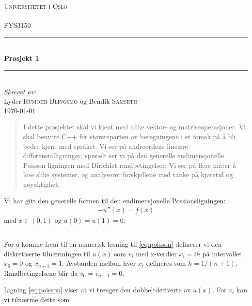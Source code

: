 \documentclass[11pt]{article}
\begin{document}
\begin{titlepage}
\newcommand{\HRule}{\rule{\linewidth}{0.5mm}}
\center
\textsc{\LARGE Universitetet i Oslo}\\[1.5cm] %
\textsc{\Large }\\[0.5cm] %
\textsc{\large FYS3150}\\[0.5cm] %
\HRule \\[0.4cm]
{ \huge \bfseries Prosjekt 1 }\\[0.4cm] %
\HRule \\[1.5cm]
\Large \emph{Skrevet av:}\\
Lyder \textsc{Rumohr Blingsmo} og Bendik \textsc{Samseth}\\[3cm]
{\large \today}\\[3cm]
\vfill
\end{titlepage}


\begin{abstract}
I dette prosjektet skal vi kjent med ulike vektor- og
matriseoperasjoner. Vi skal benytte C++ for størsteparten av
beregningene i et forsøk på å bli bedre kjent med språket. Vi ser på
andreordens lineære differensialligninger, spesielt ser vi på den
generelle endimensjonelle Poisson ligningen med Dirichlet
randbetingelser. Vi ser på flere måter å løse slike systemer, og
analyserer forskjellene med tanke på kjøretid og nøyaktighet.
\end{abstract}


Vi har gitt den generelle formen til den endimensjonelle
Possionsligningen:
\begin{align}
  -u''(x) = f(x)\label{eq:poisson}
\end{align}
med $x \in (0,1)$ og $u(0) = u(1) = 0$.

\subsection{}

For å komme frem til en numerisk løsning til \eqref{eq:poisson}
definerer vi den diskretiserte tilnærmingen til $u(x)$ som $v_i$ med
x-verdier $x_i = ih$ på intervallet $x_0 = 0$ og $x_{n+1} =
1$. Avstanden mellom hver $x_i$ defineres som $h =
1/(n+1)$. Randbetingelsene blir da $v_0 = v_{n+1} = 0$.

Ligning \eqref{eq:poisson} viser at vi trenger den dobbeltderiverte av
$u(x)$. For $v_i$ kan vi tilnærme dette som 
\end{document}
